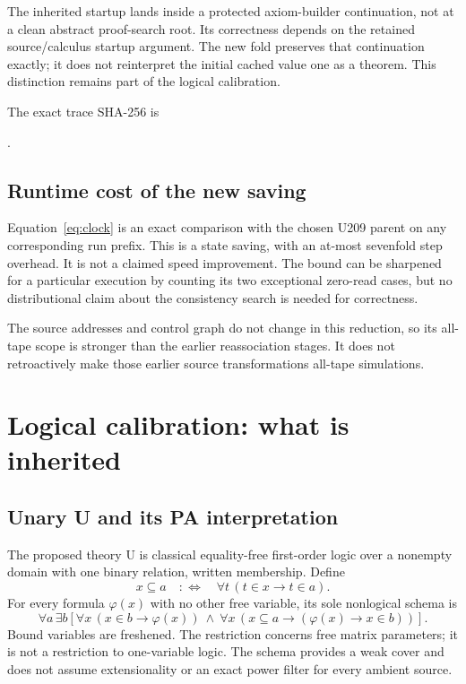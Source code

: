 \documentclass[11pt,letterpaper]{article}
\begin{document}
The inherited startup lands inside a protected axiom-builder continuation,
not at a clean abstract proof-search root. Its correctness depends on the
retained source/calculus startup argument. The new fold preserves that
continuation exactly; it does not reinterpret the initial cached value one
as a theorem. This distinction remains part of the logical calibration.

The exact trace SHA-256 is
\begin{center}\small
{}.
\end{center}

\subsection{Runtime cost of the new saving}

Equation~\eqref{eq:clock} is an exact comparison with the chosen U209 parent
on any corresponding run prefix. This is a state saving, with an at-most
sevenfold step overhead. It is not a claimed speed improvement. The bound
can be sharpened for a particular execution by counting its two exceptional
zero-read cases, but no distributional claim about the consistency search
is needed for correctness.

The source addresses and control graph do not change in this reduction,
so its all-tape scope is stronger than the earlier reassociation stages.
It does not retroactively make those earlier source transformations
all-tape simulations.

\section{Logical calibration: what is inherited}
\subsection{Unary U and its PA interpretation}

The proposed theory U is classical equality-free first-order logic over a
nonempty domain with one binary relation, written membership. Define
\[
 x\subseteq a\quad:\Longleftrightarrow\quad
 \forall t\,(t\in x\to t\in a).
\]
For every formula $\varphi(x)$ with no other free variable, its sole
nonlogical schema is
\begin{equation}\label{eq:U}
\forall a\,\exists b\left[
 \forall x\,(x\in b\to\varphi(x))\ \land\
 \forall x\,(x\subseteq a\to(\varphi(x)\to x\in b))\right].
\end{equation}
Bound variables are freshened. The restriction concerns free matrix
parameters; it is not a restriction to one-variable logic. The schema
provides a weak cover and does not assume extensionality or an exact power
filter for every ambient source.
\end{document}
